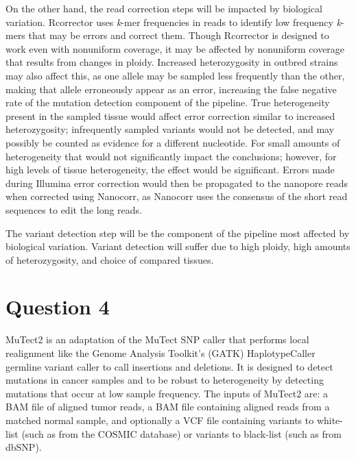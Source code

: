 On the other hand, the read correction steps will be impacted by biological variation. Rcorrector uses \textit{k}-mer frequencies in reads to identify low frequency \textit{k}-mers that may be errors and correct them. Though Rcorrector is designed to work even with nonuniform coverage, it may be affected by nonuniform coverage that results from changes in ploidy. Increased heterozygosity in outbred strains may also affect this, as one allele may be sampled less frequently than the other, making that allele erroneously appear as an error, increasing the false negative rate of the mutation detection component of the pipeline. True heterogeneity present in the sampled tissue would affect error correction similar to increased heterozygosity; infrequently sampled variants would not be detected, and may possibly be counted as evidence for a different nucleotide. For small amounts of heterogeneity that would not significantly impact the conclusions; however, for high levels of tissue heterogeneity, the effect would be significant. Errors made during Illumina error correction would then be propagated to the nanopore reads when corrected using Nanocorr, as Nanocorr uses the consensus of the short read sequences to edit the long reads.

The variant detection step will be the component of the pipeline most affected by biological variation. Variant detection will suffer due to high ploidy, high amounts of heterozygosity, and choice of compared tissues.


\section{Question 4}

MuTect2 \parencite{cibulskis_sensitive_2013} is an adaptation of the MuTect SNP caller that performs local realignment like the Genome Analysis Toolkit's (GATK) HaplotypeCaller germline variant caller to call insertions and deletions. It is designed to detect mutations in cancer samples and to be robust to heterogeneity by detecting mutations that occur at low sample frequency. The inputs of MuTect2 are: a BAM file of aligned tumor reads, a BAM file containing aligned reads from a matched normal sample, and optionally a VCF file containing variants to white-list (such as from the COSMIC database) or variants to black-list (such as from dbSNP). 

